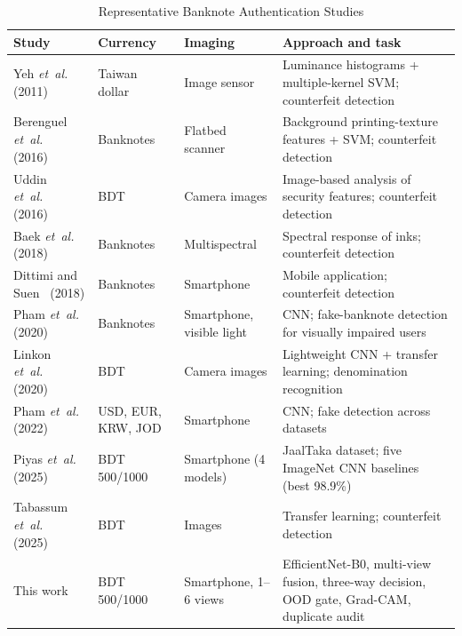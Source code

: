 \documentclass[journal]{IEEEtran}
\begin{document}
\begin{table}[!t]
\caption{Representative Banknote Authentication Studies}
\label{tab:related}
\centering
\footnotesize
\begin{tabularx}{\textwidth}{@{}L{2.9cm}L{1.9cm}L{3.1cm}X@{}}
\toprule
Study & Currency & Imaging & Approach and task \\
\midrule
Yeh \textit{et~al.}~\cite{yeh2011} (2011) & Taiwan dollar & Image sensor & Luminance histograms + multiple-kernel SVM; counterfeit detection \\
Berenguel \textit{et~al.}~\cite{berenguel2016} (2016) & Banknotes & Flatbed scanner & Background printing-texture features + SVM; counterfeit detection \\
Uddin \textit{et~al.}~\cite{uddin2016} (2016) & BDT & Camera images & Image-based analysis of security features; counterfeit detection \\
Baek \textit{et~al.}~\cite{baek2018} (2018) & Banknotes & Multispectral & Spectral response of inks; counterfeit detection \\
Dittimi and Suen~\cite{dittimi2018} (2018) & Banknotes & Smartphone & Mobile application; counterfeit detection \\
Pham \textit{et~al.}~\cite{pham2020} (2020) & Banknotes & Smartphone, visible light & CNN; fake-banknote detection for visually impaired users \\
Linkon \textit{et~al.}~\cite{linkon2020} (2020) & BDT & Camera images & Lightweight CNN + transfer learning; denomination recognition \\
Pham \textit{et~al.}~\cite{pham2022} (2022) & USD, EUR, KRW, JOD & Smartphone & CNN; fake detection across datasets \\
Piyas \textit{et~al.}~\cite{piyas2025jaaltaka} (2025) & BDT 500/1000 & Smartphone (4 models) & JaalTaka dataset; five ImageNet CNN baselines (best 98.9\%) \\
Tabassum \textit{et~al.}~\cite{tabassum2025} (2025) & BDT & Images & Transfer learning; counterfeit detection \\
\midrule
This work & BDT 500/1000 & Smartphone, 1--6 views & EfficientNet-B0, multi-view fusion, three-way decision, OOD gate, Grad-CAM, duplicate audit \\
\bottomrule
\end{tabularx}
\end{table}
\end{document}
